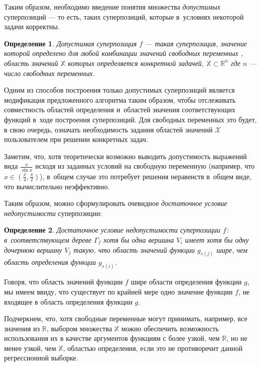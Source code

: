 \documentclass[12pt,a4paper]{amsart}
\newtheorem{defin}{Определение}
\begin{document}
Таким образом, необходимо введение понятия множества \emph{допустимых}
суперпозиций --- то есть, таких суперпозиций, которые в~условиях некоторой
задачи корректны.

\begin{defin}
  Допустимая суперпозиция $f$ --- такая суперпозиция, значение которой
  определено для любой комбинации значений свободных переменных , область
  значений $\mathbb{X}$ которых определяется конкретной задачей,
  $\mathbb{X} \subset \mathbb{R}^n$ где $n$ --- число свободных переменных.
\end{defin}

Одним из способов построения только допустимых суперпозиций является
модификация предложенного алгоритма таким образом, чтобы отслеживать
совместность областей определения и~областей значения соответствующих
функций в~ходе построения суперпозиций. Для свободных переменных это будет,
в свою очередь, означать необходимость задания областей значений
$\mathcal{X}$ пользователем при решении конкретных задач.

Заметим, что, хотя теоретически возможно выводить допустимость выражений
вида $\frac{x}{\sin x}$ исходя из заданных условий на свободную переменную
(например, что $x \in (\frac{\pi}{4}, \frac{\pi}{2})$), в~общем случае это
потребует решения неравенств в~общем виде, что вычислительно неэффективно.

Таким образом, можно сформулировать очевидное \emph{достаточное условие
недопустимости} суперпозиции:

\begin{defin}
  Достаточное условие недопустимости суперпозиции $f$: в~соответствующем дереве
  $\Gamma_f$ хотя бы одна вершина $V_i$ имеет хотя бы одну дочернюю вершину
  $V_j$ такую, что область значений функции $g_{s(j)}$ шире, чем область
  определения функции $g_{s(i)}$.
\end{defin}

Говоря, что область значений функции $f$ шире области определения функции
$g$, мы имеем ввиду, что существует по крайней мере одно значение функции
$f$, не входящее в область определения функции $g$.

Подчеркнем, что, хотя свободные переменные могут принимать, например, все
значения из $\mathbb{R}$, выбором множества $\mathbb{X}$ можно обеспечить
возможность использования их в качестве аргументов функциям с более узкой,
чем $\mathbb{R}$, но не менее узкой, чем $\mathbb{X}$, областью определения,
если это не противоречит данной регрессионной выборке.
\end{document}
